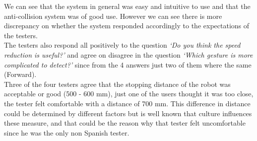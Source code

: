 We can see that the system in general was easy and intuitive to use and that the anti-collision system was of good use. However we can see there is more discrepancy on whether the system responded accordingly to the expectations of the testers.\\

The testers also respond all positively to the question \textit{`Do you think the speed reduction is useful?'} and agree on disagree in the question \textit{`Which gesture is more complicated to detect?'} since from the 4 answers just two of them where the same (Forward).\\

Three of the four testers agree that the stopping distance of the robot was acceptable or good (500 - 600 mm), just one of the users thought it was too close, the tester felt comfortable with a distance of 700 mm. This difference in distance could be determined by different factors but is well known that culture influences these measure, and that could be the reason why that tester felt uncomfortable since he was the only non Spanish tester.

